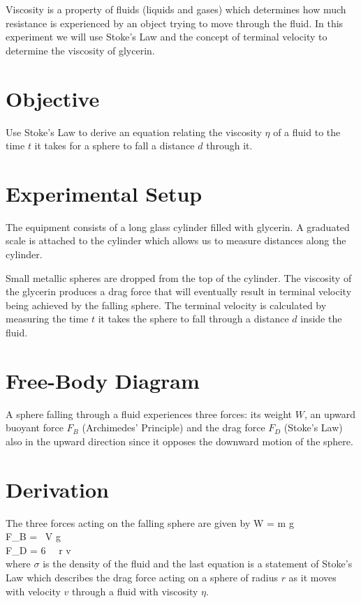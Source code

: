 Viscosity is a property of fluids (liquids and gases) which determines how much resistance is experienced by an object trying to move through the fluid. In this experiment we will use Stoke's Law and the concept of terminal velocity to determine the viscosity of glycerin.

\section*{Objective}

   Use Stoke's Law to derive an equation relating the viscosity $\eta$ of a fluid to the time $t$ it takes for a sphere to fall a distance $d$ through it.

\section*{Experimental Setup}

   The equipment consists of a long glass cylinder filled with glycerin. A graduated scale is attached to the cylinder which allows us to measure distances along the cylinder.
   
   Small metallic spheres are dropped from the top of the cylinder. The viscosity of the glycerin produces a drag force that will eventually result in terminal velocity being achieved by the falling sphere. The terminal velocity is calculated by measuring the time $t$ it takes the sphere to fall through a distance $d$ inside the fluid.

   

\section*{Free-Body Diagram}

   A sphere falling through a fluid experiences three forces: its weight $W$, an upward buoyant force $F_B$ (Archimedes' Principle) and the drag force $F_D$ (Stoke's Law) also in the upward direction since it opposes the downward motion of the sphere.

   

\section*{Derivation}

   The three forces acting on the falling sphere are given by
   \beqc \label{three_forces}
      W = m g\\
      F_B = \sigma \, V g\\
      F_D = 6 \pi \, \eta \, r v\\
   \eeqc
   where $\sigma$ is the density of the fluid and the last equation is a statement of Stoke's Law which describes the drag force acting on a sphere of radius $r$ as it moves with velocity $v$ through a fluid with viscosity $\eta$.

